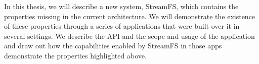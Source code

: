 In this thesis, we will describe a new system, StreamFS, which contains the properties missing in the current architecture.  We will demonstrate 
the existence of these properties through a series of applications that were built over it in several settings.  We describe the API and
the scope and usage of the application and draw out how the capabilities enabled by StreamFS in those apps demonstrate the properties highlighted
above.

































